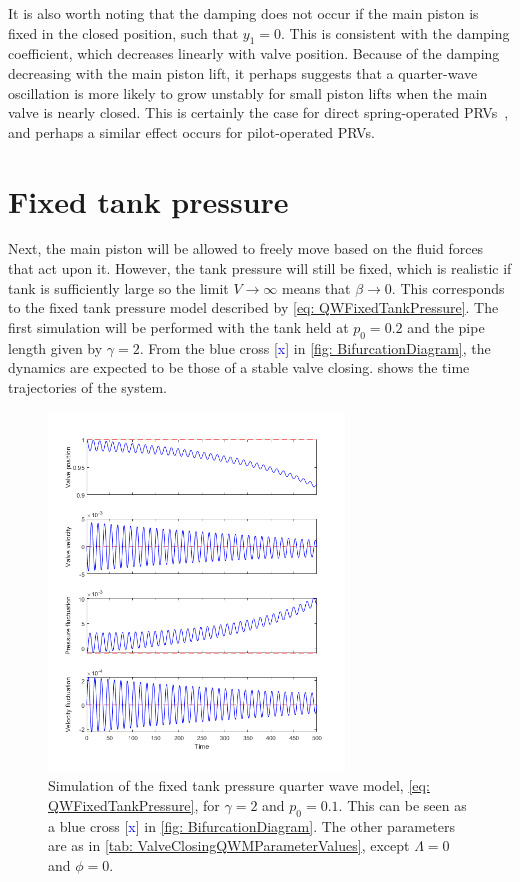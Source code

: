 It is also worth noting that the damping does not occur if the main piston is fixed in the closed position, such that $y_1 = 0$. This is consistent with the damping coefficient, which decreases linearly with valve position. Because of the damping decreasing with the main piston lift, it perhaps suggests that a quarter-wave oscillation is more likely to grow unstably for small piston lifts when the main valve is nearly closed. This is certainly the case for direct spring-operated PRVs~\cite{Hos2017DynamicRecommendations}, and perhaps a similar effect occurs for pilot-operated PRVs.

\newpage
\section{Fixed tank pressure}

Next, the main piston will be allowed to freely move based on the fluid forces that act upon it. However, the tank pressure will still be fixed, which is realistic if tank is sufficiently large so the limit $V \rightarrow \infty$ means that $\beta \rightarrow 0$. This corresponds to the fixed tank pressure model described by \cref{eq: QWFixedTankPressure}. The first simulation will be performed with the tank held at $p_0 = 0.2$ and the pipe length given by $\gamma = 2$. From the blue cross [\textcolor{Blue}{x}] in \cref{fig: BifurcationDiagram}, the dynamics are expected to be those of a stable valve closing.  shows the time trajectories of the system.
~
\begin{figure}[ht]
    \centering
    \includegraphics[width=0.7\textwidth]{Figures/CloseToHopf/HopfStable.png}
    \caption{Simulation of the fixed tank pressure quarter wave model, \cref{eq: QWFixedTankPressure}, for $\gamma = 2$ and $p_0 = 0.1$. This can be seen as a blue cross [\textcolor{Blue}{x}] in \cref{fig: BifurcationDiagram}. The other parameters are as in \cref{tab: ValveClosingQWMParameterValues}, except $\Lambda=0$ and $\phi=0$.}
    \label{fig: StableHopf}
\end{figure}

